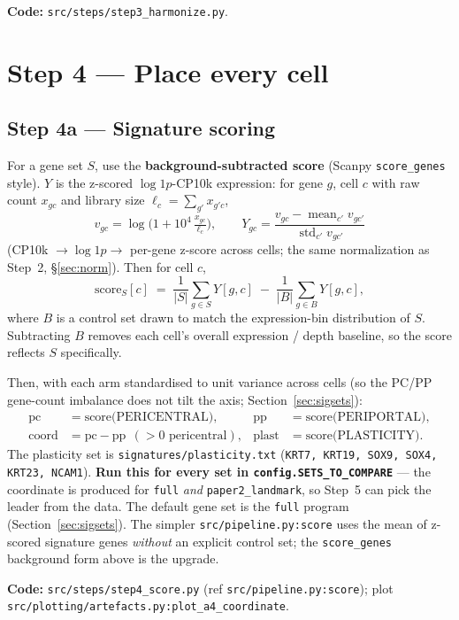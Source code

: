 \documentclass[11pt]{article}
\newcommand{\code}[1]{\texttt{\small #1}}
\newcommand{\coordc}{\mathrm{coord}}
\begin{document}
\medskip
\noindent\textbf{Code:} \code{src/steps/step3\_harmonize.py}.

\section{Step 4 --- Place every cell}

\subsection{Step 4a --- Signature scoring}
For a gene set $S$, use the \textbf{background-subtracted score} (Scanpy \code{score\_genes}
style). $Y$ is the z-scored $\log 1p$-CP10k expression: for gene $g$, cell $c$ with raw count
$x_{gc}$ and library size $\ell_c=\sum_{g'} x_{g'c}$,
\[
  v_{gc}=\log\!\Big(1+10^{4}\,\tfrac{x_{gc}}{\ell_c}\Big),
  \qquad
  Y_{gc}=\frac{v_{gc}-\operatorname{mean}_{c'} v_{gc'}}{\operatorname{std}_{c'} v_{gc'}}
\]
(CP10k $\to \log 1p \to$ per-gene z-score across cells; the same normalization as Step~2,
\S\ref{sec:norm}). Then for cell $c$,
\[
  \text{score}_S[c] \;=\; \frac{1}{|S|}\sum_{g \in S} Y[g,c]
                       \;-\; \frac{1}{|B|}\sum_{g \in B} Y[g,c],
\]
where $B$ is a control set drawn to match the expression-bin distribution of $S$. Subtracting $B$
removes each cell's overall expression / depth baseline, so the score reflects $S$ specifically.

Then, with each arm standardised to unit variance across cells (so the PC/PP gene-count
imbalance does not tilt the axis; Section~\ref{sec:sigsets}):
\begin{align}
  \text{pc} &= \text{score(PERICENTRAL)}, & \text{pp} &= \text{score(PERIPORTAL)}, \\
  \coordc   &= \text{pc} - \text{pp}\ \ (>0\text{ pericentral}), & \text{plast} &= \text{score(PLASTICITY)}.
\end{align}
The plasticity set is \code{signatures/plasticity.txt} (\code{KRT7, KRT19, SOX9, SOX4, KRT23,
NCAM1}). \textbf{Run this for every set in \code{config.SETS\_TO\_COMPARE}} --- the coordinate is
produced for \code{full} \emph{and} \code{paper2\_landmark}, so Step~5 can pick the leader from the
data. The default gene set is the \code{full} program (Section~\ref{sec:sigsets}). The simpler
\code{src/pipeline.py:score} uses the mean of z-scored signature genes \emph{without} an explicit
control set; the \code{score\_genes} background form above is the upgrade.

\medskip
\noindent\textbf{Code:} \code{src/steps/step4\_score.py} (ref \code{src/pipeline.py:score});
plot \code{src/plotting/artefacts.py:plot\_a4\_coordinate}.
\end{document}
